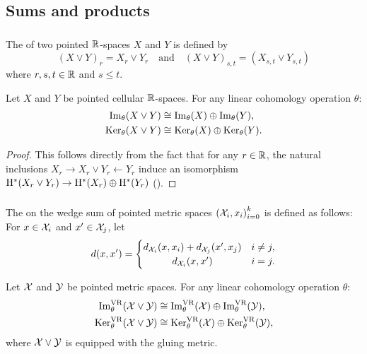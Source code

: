 
\subsection{Sums and products}\label{ss:sums_products}

\subsubsection{}

The  of two pointed $\mathbb{R}$-spaces $X$ and $Y$ is defined by
\[
(X \vee Y)_r = X_r \vee Y_r \quad\text{and}\quad (X \vee Y)_{s,t} = (X_{s,t} \vee Y_{s,t})
\]
where \(r,s,t \in \mathbb{R}\) and \(s \leq t\).

\medskip\lemma
Let $X$ and $Y$ be pointed cellular $\mathbb{R}$-spaces.
For any linear cohomology operation $\theta$:
\begin{align*}
	\operatorname{Im}_\theta(X \vee Y) &\cong \operatorname{Im}_\theta(X) \oplus \operatorname{Im}_\theta(Y), \\
	\operatorname{Ker}_\theta(X \vee Y) &\cong \operatorname{Ker}_\theta(X) \oplus \operatorname{Ker}_\theta(Y).
\end{align*}

\begin{proof}
	This follows directly from the fact that for any \(r \in \mathbb{R}\), the natural inclusions $X_r \to X_r \vee Y_r \leftarrow Y_r$ induce an isomorphism $\mathrm{H}^*(X_r \vee Y_r) \to \mathrm{H}^*(X_r) \oplus \mathrm{H}^*(Y_r)$ (\cite[Cor.~2.25.]{hatcher2000}).
\end{proof}

\subsubsection{}\label{ss:wedge sum}

The  on the wedge sum of pointed metric spaces ${(\mathcal{X}_i, x_i)}_{i = 0}^k$ is defined as follows: For $x \in \mathcal{X}_i$ and $x' \in \mathcal{X}_j$, let
\[
d(x, x') =
\begin{cases}
	d_{\cX_i}(x, x_i) + d_{\cX_j}(x', x_j) & i \neq j, \\
	\hfil d_{\cX_i}(x, x') & i = j.
\end{cases}
\]

\medskip\theorem
Let $\mathcal{X}$ and $\mathcal{Y}$ be pointed metric spaces.
For any linear cohomology operation $\theta$:
\begin{align*}
	\operatorname{Im}_\theta^{\mathrm{VR}}(\mathcal{X} \vee \mathcal{Y}) &\cong \operatorname{Im}_\theta^{\mathrm{VR}}(\mathcal{X}) \oplus \operatorname{Im}_\theta^{\mathrm{VR}}(\mathcal{Y}), \\
	\operatorname{Ker}_\theta^{\mathrm{VR}}(\mathcal{X} \vee \mathcal{Y}) &\cong \operatorname{Ker}_\theta^{\mathrm{VR}}(\mathcal{X}) \oplus \operatorname{Ker}_\theta^{\mathrm{VR}}(\mathcal{Y}),
\end{align*}
where \(\mathcal{X} \vee \mathcal{Y}\) is equipped with the gluing metric.

